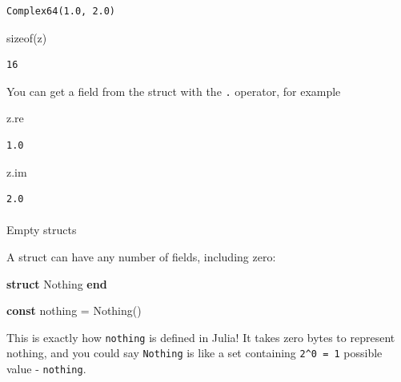 \documentclass[
]{article}
\makeatletter
\let\oldparagraph\paragraph
\renewcommand{\paragraph}{
    \@ifstar
      \xxxParagraphStar
      \xxxParagraphNoStar
  }
\newcommand{\xxxParagraphStar}[1]{\oldparagraph*{#1}\mbox{}}
\newcommand{\xxxParagraphNoStar}[1]{\oldparagraph{#1}\mbox{}}
\newenvironment{Shaded}{\begin{snugshade}}{\end{snugshade}}
\newcommand{\ConstantTok}[1]{\textcolor[rgb]{0.56,0.35,0.01}{#1}}
\newcommand{\DataTypeTok}[1]{\textcolor[rgb]{0.68,0.00,0.00}{#1}}
\newcommand{\FunctionTok}[1]{\textcolor[rgb]{0.28,0.35,0.67}{#1}}
\newcommand{\KeywordTok}[1]{\textcolor[rgb]{0.00,0.23,0.31}{\textbf{#1}}}
\newcommand{\NormalTok}[1]{\textcolor[rgb]{0.00,0.23,0.31}{#1}}
\newcommand{\OperatorTok}[1]{\textcolor[rgb]{0.37,0.37,0.37}{#1}}
\makeatother
\begin{document}
\begin{verbatim}
Complex64(1.0, 2.0)
\end{verbatim}

\begin{Shaded}
\begin{Highlighting}[]
\FunctionTok{sizeof}\NormalTok{(z)}
\end{Highlighting}
\end{Shaded}

\begin{verbatim}
16
\end{verbatim}

You can get a field from the struct with the \texttt{.} operator, for
example

\begin{Shaded}
\begin{Highlighting}[]
\NormalTok{z.re}
\end{Highlighting}
\end{Shaded}

\begin{verbatim}
1.0
\end{verbatim}

\begin{Shaded}
\begin{Highlighting}[]
\NormalTok{z.}\ConstantTok{im}
\end{Highlighting}
\end{Shaded}

\begin{verbatim}
2.0
\end{verbatim}

\paragraph{Empty structs}\label{empty-structs}

A struct can have any number of fields, including zero:

\begin{Shaded}
\begin{Highlighting}[]
\KeywordTok{struct} \DataTypeTok{Nothing}
\KeywordTok{end}

\KeywordTok{const} \ConstantTok{nothing} \OperatorTok{=} \FunctionTok{Nothing}\NormalTok{()}
\end{Highlighting}
\end{Shaded}

This is exactly how \texttt{nothing} is defined in Julia! It takes zero
bytes to represent nothing, and you could say \texttt{Nothing} is like a
set containing \texttt{2\^{}0\ =\ 1} possible value - \texttt{nothing}.
\end{document}
